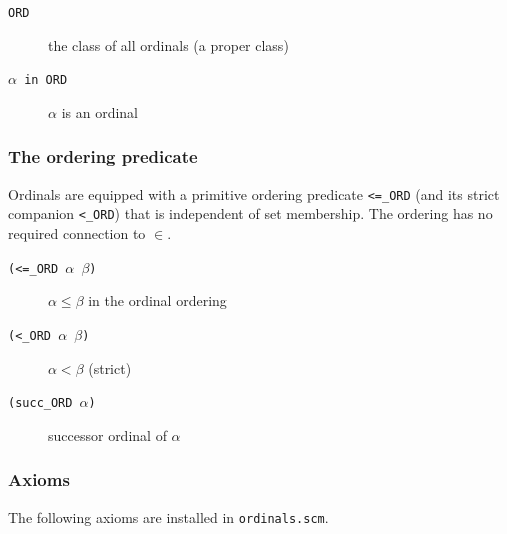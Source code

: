 \documentclass{amsbook}[openany]
\theoremstyle{definition}
\theoremstyle{remark}
\theoremstyle{remark}
\begin{document}
\begin{description}
\item[\texttt{ORD}] the class of all ordinals (a proper class)
\item[\texttt{$\alpha$ in ORD}] $\alpha$ is an ordinal
\end{description}

\subsubsection{The ordering predicate}

Ordinals are equipped with a primitive ordering predicate \texttt{<=\_ORD}
(and its strict companion \texttt{<\_ORD}) that is independent of set
membership.  The ordering has no required connection to $\in$.

\begin{description}
\item[\texttt{(<=\_ORD $\alpha$\ $\beta$)}] $\alpha \leq \beta$ in the ordinal ordering
\item[\texttt{(<\_ORD $\alpha$\ $\beta$)}] $\alpha < \beta$ (strict)
\item[\texttt{(succ\_ORD $\alpha$)}] successor ordinal of $\alpha$
\end{description}

\subsubsection{Axioms}

The following axioms are installed in \texttt{ordinals.scm}.
\end{document}
